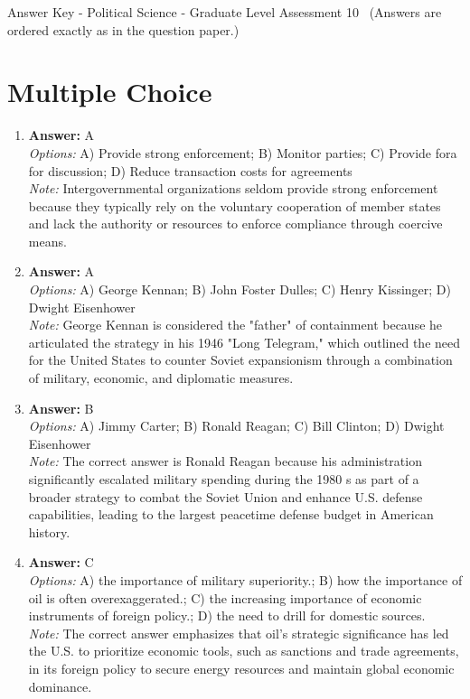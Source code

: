 \documentclass[12pt]{article}
\begin{document}
\begin{center}
Answer Key - Political Science - Graduate Level Assessment 10 \
\small (Answers are ordered exactly as in the question paper.)
\end{center}

\section*{Multiple Choice}
\begin{enumerate}[label=\arabic*.]
\item \textbf{Answer:} A
\\ \textit{Options:} A) Provide strong enforcement; B) Monitor parties; C) Provide fora for discussion; D) Reduce transaction costs for agreements
\\ \textit{Note:} Intergovernmental organizations seldom provide strong enforcement because they typically rely on the voluntary cooperation of member states and lack the authority or resources to enforce compliance through coercive means.
\item \textbf{Answer:} A
\\ \textit{Options:} A) George Kennan; B) John Foster Dulles; C) Henry Kissinger; D) Dwight Eisenhower
\\ \textit{Note:} George Kennan is considered the "father" of containment because he articulated the strategy in his 1946 "Long Telegram," which outlined the need for the United States to counter Soviet expansionism through a combination of military, economic, and diplomatic measures.
\item \textbf{Answer:} B
\\ \textit{Options:} A) Jimmy Carter; B) Ronald Reagan; C) Bill Clinton; D) Dwight Eisenhower
\\ \textit{Note:} The correct answer is Ronald Reagan because his administration significantly escalated military spending during the 1980 s as part of a broader strategy to combat the Soviet Union and enhance U.S. defense capabilities, leading to the largest peacetime defense budget in American history.
\item \textbf{Answer:} C
\\ \textit{Options:} A) the importance of military superiority.; B) how the importance of oil is often overexaggerated.; C) the increasing importance of economic instruments of foreign policy.; D) the need to drill for domestic sources.
\\ \textit{Note:} The correct answer emphasizes that oil's strategic significance has led the U.S. to prioritize economic tools, such as sanctions and trade agreements, in its foreign policy to secure energy resources and maintain global economic dominance.

\end{enumerate}
\end{document}

